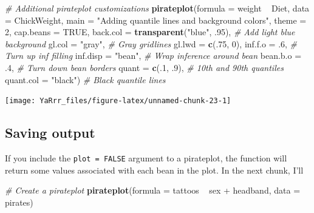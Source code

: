 \documentclass[]{book}
\newenvironment{Shaded}{\begin{snugshade}}{\end{snugshade}}
\newcommand{\KeywordTok}[1]{\textcolor[rgb]{0.13,0.29,0.53}{\textbf{{#1}}}}
\newcommand{\DataTypeTok}[1]{\textcolor[rgb]{0.13,0.29,0.53}{{#1}}}
\newcommand{\DecValTok}[1]{\textcolor[rgb]{0.00,0.00,0.81}{{#1}}}
\newcommand{\StringTok}[1]{\textcolor[rgb]{0.31,0.60,0.02}{{#1}}}
\newcommand{\CommentTok}[1]{\textcolor[rgb]{0.56,0.35,0.01}{\textit{{#1}}}}
\newcommand{\OtherTok}[1]{\textcolor[rgb]{0.56,0.35,0.01}{{#1}}}
\newcommand{\NormalTok}[1]{{#1}}
\theoremstyle{definition}
\theoremstyle{definition}
\theoremstyle{remark}
\begin{document}
\begin{Shaded}
\begin{Highlighting}[]
\CommentTok{# Additional pirateplot customizations}
\KeywordTok{pirateplot}\NormalTok{(}\DataTypeTok{formula =} \NormalTok{weight ~}\StringTok{ }\NormalTok{Diet, }
           \DataTypeTok{data =} \NormalTok{ChickWeight,}
           \DataTypeTok{main =} \StringTok{"Adding quantile lines and background colors"}\NormalTok{,}
           \DataTypeTok{theme =} \DecValTok{2}\NormalTok{,}
           \DataTypeTok{cap.beans =} \OtherTok{TRUE}\NormalTok{,}
           \DataTypeTok{back.col =} \KeywordTok{transparent}\NormalTok{(}\StringTok{"blue"}\NormalTok{, .}\DecValTok{95}\NormalTok{), }\CommentTok{# Add light blue background}
           \DataTypeTok{gl.col =} \StringTok{"gray"}\NormalTok{, }\CommentTok{# Gray gridlines}
           \DataTypeTok{gl.lwd =} \KeywordTok{c}\NormalTok{(.}\DecValTok{75}\NormalTok{, }\DecValTok{0}\NormalTok{),}
           \DataTypeTok{inf.f.o =} \NormalTok{.}\DecValTok{6}\NormalTok{, }\CommentTok{# Turn up inf filling}
           \DataTypeTok{inf.disp =} \StringTok{"bean"}\NormalTok{, }\CommentTok{# Wrap inference around bean}
           \DataTypeTok{bean.b.o =} \NormalTok{.}\DecValTok{4}\NormalTok{, }\CommentTok{# Turn down bean borders}
           \DataTypeTok{quant =} \KeywordTok{c}\NormalTok{(.}\DecValTok{1}\NormalTok{, .}\DecValTok{9}\NormalTok{), }\CommentTok{# 10th and 90th quantiles}
           \DataTypeTok{quant.col =} \StringTok{"black"}\NormalTok{) }\CommentTok{# Black quantile lines}
\end{Highlighting}
\end{Shaded}

\begin{center}\texttt{[image: YaRrr\_files/figure-latex/unnamed-chunk-23-1]} \end{center}

\subsection{Saving output}\label{saving-output}

If you include the \texttt{plot\ =\ FALSE} argument to a pirateplot, the
function will return some values associated with each bean in the plot.
In the next chunk, I'll

\begin{Shaded}
\begin{Highlighting}[]
\CommentTok{# Create a pirateplot}
\KeywordTok{pirateplot}\NormalTok{(}\DataTypeTok{formula =} \NormalTok{tattoos ~}\StringTok{ }\NormalTok{sex +}\StringTok{ }\NormalTok{headband,}
           \DataTypeTok{data =} \NormalTok{pirates)}
\end{Highlighting}
\end{Shaded}
\end{document}
